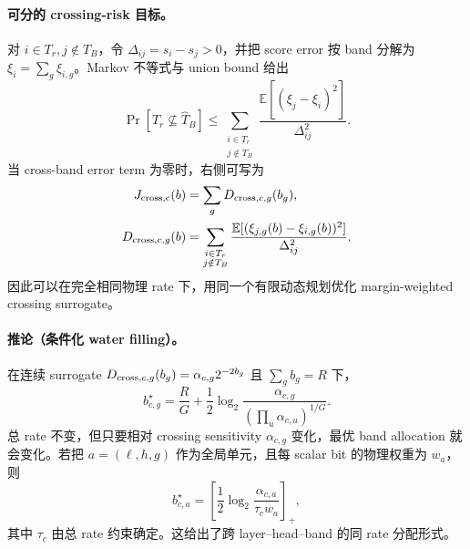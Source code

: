 \paragraph{可分的 crossing-risk 目标。}
对 $i\in T_r,j\notin T_B$，令 $\Delta_{ij}=s_i-s_j>0$，并把 score error
按 band 分解为 $\xi_i=\sum_g\xi_{i,g}$。Markov 不等式与 union bound 给出
\begin{equation}
 \Pr[T_r\not\subseteq\widehat T_B]
 \le\sum_{\substack{i\in T_r\\j\notin T_B}}
 \frac{\mathbb E[(\xi_j-\xi_i)^2]}{\Delta_{ij}^2}.
 \label{eq:crossing-markov-objective}
\end{equation}
当 cross-band error term 为零时，右侧可写为
\begin{align}
 J_{\rm cross,c}(b)&=\sum_gD_{{\rm cross},c,g}(b_g),\\
 D_{{\rm cross},c,g}(b)
 &=\sum_{\substack{i\in T_r\\j\notin T_B}}
 \frac{\mathbb E[(\xi_{j,g}(b)-\xi_{i,g}(b))^2]}
 {\Delta_{ij}^2}.
 \label{eq:crossing-band-distortion}
\end{align}
因此可以在完全相同物理 rate 下，用同一个有限动态规划优化 margin-weighted
crossing surrogate。

\paragraph{推论（条件化 water filling）。}
在连续 surrogate
$D_{{\rm cross},c,g}(b_g)=\alpha_{c,g}2^{-2b_g}$ 且
$\sum_gb_g=R$ 下，
\begin{equation}
 b_{c,g}^\star=
 \frac RG+\frac12\log_2
 \frac{\alpha_{c,g}}{(\prod_u\alpha_{c,u})^{1/G}} .
 \label{eq:conditional-waterfilling}
\end{equation}
总 rate 不变，但只要相对 crossing sensitivity
$\alpha_{c,g}$ 变化，最优 band allocation 就会变化。若把
$a=(\ell,h,g)$ 作为全局单元，且每 scalar bit 的物理权重为 $w_a$，则
\begin{equation}
 b_{c,a}^{\star}
 =\left[\frac12\log_2\frac{\alpha_{c,a}}{\tau_cw_a}\right]_+,
 \label{eq:global-conditional-waterfilling}
\end{equation}
其中 $\tau_c$ 由总 rate 约束确定。这给出了跨 layer--head--band 的同 rate
分配形式。

